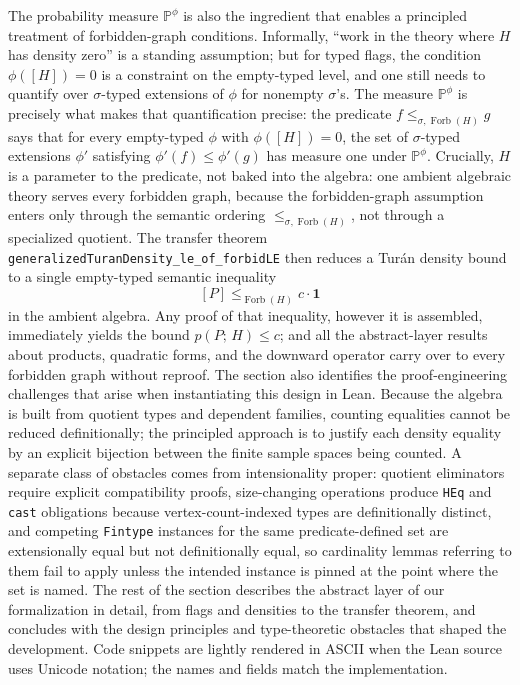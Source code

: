 \documentclass{article}
\newcommand{\tdensity}[2]{p(#1;\,#2)}
\newcommand{\forbLE}[1]{\leq_{\operatorname{Forb}(#1)}}
\newcommand{\forbLES}[2]{\leq_{#1,\operatorname{Forb}(#2)}}
\newcommand{\lean}[1]{\texttt{#1}}
\begin{document}
The probability measure $\mathbb{P}^{\phi}$ is also the
ingredient that enables a principled treatment of forbidden-graph conditions.
Informally, ``work in the theory where $H$ has density zero'' is a standing
assumption; but for typed flags, the condition $\phi([H])=0$ is a constraint
on the empty-typed level, and one still needs to quantify over $\sigma$-typed 
extensions of $\phi$ for nonempty $\sigma$'s.  The measure $\mathbb{P}^{\phi}$ is precisely what makes that
quantification precise: the predicate $f \forbLES{\sigma}{H} g$ says that for every
empty-typed $\phi$ with $\phi([H])=0$, the set of $\sigma$-typed
extensions $\phi'$ satisfying $\phi'(f)\leq\phi'(g)$ has measure one under
$\mathbb{P}^{\phi}$.  Crucially, $H$ is a parameter to the predicate, not
baked into the algebra: one ambient algebraic theory serves every forbidden
graph, because the forbidden-graph assumption enters only through the semantic
ordering $\forbLES{\sigma}{H}$, not through a specialized quotient.  The transfer
theorem \lean{generalizedTuranDensity\_le\_of\_forbidLE} then reduces a Turán
density bound to a single empty-typed semantic inequality
\[
  [P] \forbLE{H} c\cdot\mathbf{1}
\]
in the ambient algebra.  Any proof of that inequality, however it is assembled,
immediately yields the bound $\tdensity{P}{H}\leq c$; and all the
abstract-layer results about products, quadratic forms, and the downward
operator carry over to every forbidden graph without reproof.  The section also
identifies the proof-engineering challenges that arise when instantiating this
design in Lean.  Because the algebra is built from quotient types and dependent
families, counting equalities cannot be reduced definitionally; the principled
approach is to justify each density equality by an explicit bijection between
the finite sample spaces being counted.  A separate class of obstacles comes
from intensionality proper: quotient eliminators require explicit compatibility
proofs, size-changing operations produce \lean{HEq} and \lean{cast}
obligations because vertex-count-indexed types are definitionally distinct, and
competing \lean{Fintype} instances for the same predicate-defined set are
extensionally equal but not definitionally equal, so cardinality lemmas referring to them fail
to apply unless the intended instance is pinned at the point where the set is
named.  The rest of the section describes the abstract layer of our
formalization in
detail, from flags and densities to the transfer theorem, and concludes with
the design principles and type-theoretic obstacles that shaped the development.
Code snippets are lightly rendered in ASCII when the Lean source uses Unicode
notation; the names and fields match the implementation.
\end{document}
